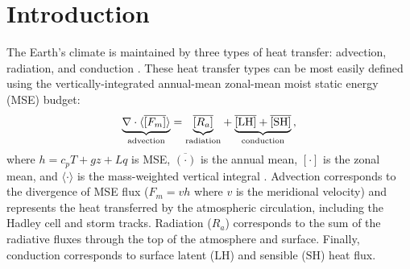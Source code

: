 \documentclass{ametsocV5}
\begin{document}




\section{Introduction}

The Earth's climate is maintained by three types of heat transfer: advection, radiation, and conduction \citep{hartmann2016}. These heat transfer types can be most easily defined using the vertically-integrated annual-mean zonal-mean moist static energy (MSE) budget:
\begin{equation} \label{eq:mse-ann}
    {\underbrace{\nabla\cdot \langle \overline{[F_{m}]}\rangle}_{\text{advection}}} = {\underbrace{\vphantom{\nabla\cdot \langle [F_{m}]\rangle} \overline{[R_{a}]}}_\text{radiation}} + {\underbrace{\vphantom{\nabla\cdot \langle [F_{m}]\rangle} \mathrm{\overline{[LH]}+\overline{[SH]}}}_\text{conduction}} \, ,
\end{equation}
where $h=c_p T + gz + Lq$ is MSE, $\overline{(\cdot)}$ is the annual mean, $[\cdot]$ is the zonal mean, and $\langle \cdot \rangle$ is the mass-weighted vertical integral \citep{neelin1987}. Advection corresponds to the divergence of MSE flux ($F_m=vh$ where $v$ is the meridional velocity) and represents the heat transferred by the atmospheric circulation, including the Hadley cell and storm tracks. Radiation ($R_a$) corresponds to the sum of the radiative fluxes through the top of the atmosphere and surface. Finally, conduction corresponds to surface latent ($\mathrm{LH}$) and sensible ($\mathrm{SH}$) heat flux.
\end{document}
